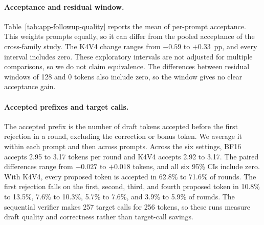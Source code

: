 \documentclass{article}
\begin{document}
\begin{table}[ht]
  \centering
  \small
  \caption{Acceptance in \% for 256-token continuations with 24 prompts per
  row. Differences are in pp with paired 95\% CIs. The last column
  compares K4V4 at residual windows of 128 and 0.}
  \label{tab:app-followup-quality}
\end{table}

\paragraph{Acceptance and residual window.}
Table~\ref{tab:app-followup-quality} reports the mean of per-prompt acceptance.
This weights prompts equally, so it can differ from the pooled acceptance of
the cross-family study. The K4V4 change ranges from $-0.59$ to $+0.33$~pp, and every interval includes
zero. These exploratory intervals are not adjusted for multiple comparisons, so
we do not claim equivalence. The differences between residual windows of 128
and 0 tokens also include zero, so the window gives no clear acceptance gain.

\paragraph{Accepted prefixes and target calls.}
The accepted prefix is the number of draft tokens accepted before the first
rejection in a round, excluding the correction or bonus token. We average it
within each prompt and then across prompts. Across the six settings, BF16
accepts 2.95 to 3.17 tokens per round and K4V4 accepts 2.92 to 3.17. The paired
differences range from $-0.027$ to $+0.018$ tokens, and all six 95\% CIs
include zero. With K4V4, every proposed token is accepted in 62.8\% to 71.6\%
of rounds. The first rejection falls on the first, second, third, and fourth
proposed token in 10.8\% to 13.5\%, 7.6\% to 10.3\%, 5.7\% to 7.6\%, and 3.9\%
to 5.9\% of rounds. The sequential verifier makes 257 target calls for 256 tokens,
so these runs measure draft quality and correctness rather than target-call
savings.
\end{document}

